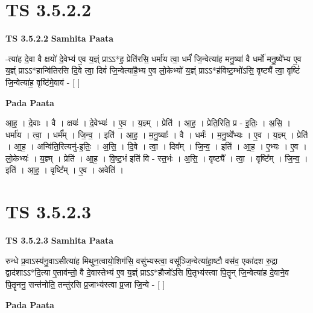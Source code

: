 \documentclass[17pt]{extarticle}
\begin{document}
\section*{ TS 3.5.2.2 }

\textbf{TS 3.5.2.2 } \newline
\textbf{Samhita Paata} \newline

-त्या॑ह दे॒वा वै क्षयो॑ दे॒वेभ्य॑ ए॒व य॒ज्ञ्ं प्राऽऽ*ह॒ प्रेति॑रसि॒ धर्मा॑य त्वा॒ धर्मं॑ जि॒न्वेत्या॑ह मनु॒ष्या॑ वै धर्मो॑ मनु॒ष्ये᳚भ्य ए॒व य॒ज्ञ्ं प्राऽऽ*हान्वि॑तिरसि दि॒वे त्वा॒ दिवं॑ जि॒न्वेत्या॑है॒भ्य ए॒व लो॒केभ्यो॑ य॒ज्ञ्ं प्राऽऽ*ह॑विष्ट॒म्भो॑ऽसि॒ वृष्ट्यै᳚ त्वा॒ वृष्टिं॑ जि॒न्वेत्या॑ह॒ वृष्टि॑मे॒वाव॑ - [  ] \newline

\textbf{Pada Paata} \newline

आ॒ह॒ । दे॒वाः । वै । क्षयः॑ । दे॒वेभ्यः॑ । ए॒व । य॒ज्ञ्म् । प्रेति॑ । आ॒ह॒ । प्रेति॒रिति॒ प्र - इ॒तिः॒ । अ॒सि॒ । धर्मा॑य । त्वा॒ । धर्म᳚म् । जि॒न्व॒ । इति॑ । आ॒ह॒ । म॒नु॒ष्याः᳚ । वै । धर्मः॑ । म॒नु॒ष्ये᳚भ्यः । ए॒व । य॒ज्ञ्म् । प्रेति॑ । आ॒ह॒ । अन्वि॑ति॒रित्यनु॑-इ॒तिः॒ । अ॒सि॒ । दि॒वे । त्वा॒ । दिव᳚म् । जि॒न्व॒ । इति॑ । आ॒ह॒ । ए॒भ्यः । ए॒व । लो॒केभ्यः॑ । य॒ज्ञ्म् । प्रेति॑ । आ॒ह॒ । वि॒ष्ट॒भं इति॑ वि - स्त॒भंः । अ॒सि॒ । वृष्ट्यै᳚ । त्वा॒ । वृष्टि᳚म् । जि॒न्व॒ । इति॑ । आ॒ह॒ । वृष्टि᳚म् । ए॒व । अवेति॑ ।  \newline




\section*{ TS 3.5.2.3 }

\textbf{TS 3.5.2.3 } \newline
\textbf{Samhita Paata} \newline

रुन्धे प्र॒वाऽस्य॑नु॒वाऽसीत्या॑ह मिथुन॒त्वायो॒शिग॑सि॒ वसु॑भ्यस्त्वा॒ वसू᳚ञ्जि॒न्वेत्या॑हा॒ष्टौ वस॑व॒ एका॑दश रु॒द्रा द्वाद॑शाऽऽ*दि॒त्या ए॒ताव॑न्तो॒ वै दे॒वास्तेभ्य॑ ए॒व य॒ज्ञ्ं प्राऽऽ*हौजो॑ऽसि पि॒तृभ्य॑स्त्वा पि॒तॄन् जि॒न्वेत्या॑ह दे॒वाने॒व पि॒तॄननु॒ सन्त॑नोति॒ तन्तु॑रसि प्र॒जाभ्य॑स्त्वा प्र॒जा जि॒न्वे - [  ] \newline

\textbf{Pada Paata} \newline
\end{document}

